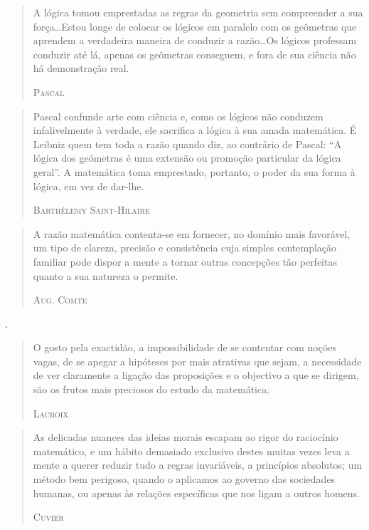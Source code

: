 \documentclass{hipatia}
\begin{document}
\begin{quote}
A lógica tomou emprestadas as regras da geometria sem compreender a sua força\dots  Estou longe de colocar os lógicos em paralelo com os geômetras que aprendem a verdadeira maneira de conduzir a razão\dots   Os lógicos professam conduzir até lá, apenas os geômetras conseguem, e fora de sua ciência não há demonstração real.

\hfill \textsc{Pascal}
\end{quote}


\begin{quote}
Pascal confunde arte com ciência e, como os lógicos não conduzem infalivelmente à verdade, ele sacrifica a lógica à sua amada matemática. É Leibniz quem tem toda a razão quando diz, ao contrário de Pascal: ``A lógica dos geómetras é uma extensão ou promoção particular da lógica geral''. A matemática toma emprestado, portanto, o poder da sua forma à lógica, em vez de dar-lhe.

\hfill \textsc{Barthélemy Saint-Hilaire}
\end{quote}

 
\begin{quote}
A razão matemática contenta-se em fornecer, no domínio mais favorável, um tipo de clareza, precisão e consistência cuja simples contemplação familiar pode dispor a mente a tornar outras concepções tão perfeitas quanto a sua natureza o permite.

\hfill \textsc{Aug. Comte}
\end{quote}.


\begin{quote}
O gosto pela exactidão, a impossibilidade de se contentar com noções vagas, de se apegar a hipóteses por mais atrativas que sejam, a necessidade de ver claramente a ligação das proposições e o objectivo a que se dirigem, são os frutos mais preciosos do estudo da matemática.

\hfill \textsc{Lacroix}
\end{quote}
 
\begin{quote}
As delicadas nuances das ideias morais escapam ao rigor do raciocínio matemático, e um hábito demasiado exclusivo destes muitas vezes leva a mente a querer reduzir tudo a regras invariáveis, a princípios absolutos; um método bem perigoso, quando o aplicamos ao governo das sociedades humanas, ou apenas às relações específicas que nos ligam a outros homens.

\hfill \textsc{Cuvier}
\end{quote}
\end{document}
